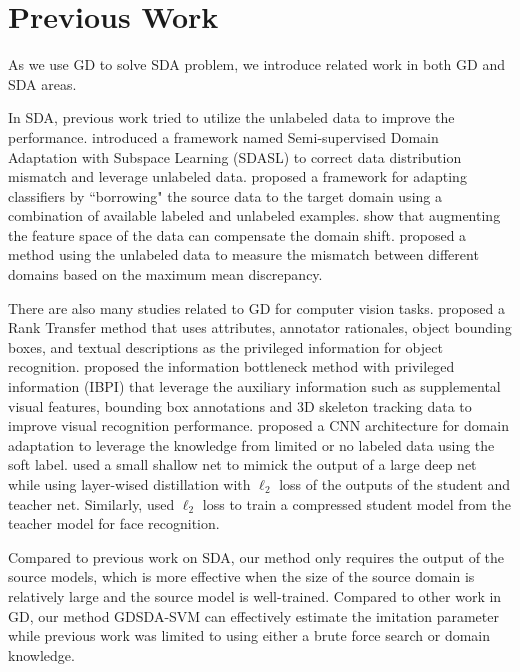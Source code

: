 \section{Previous Work}\label{sec:aaai:work}
As we use GD to solve SDA problem, we introduce related work in both GD and SDA areas.

In SDA, previous work tried to utilize the unlabeled data to improve the performance.  \cite{yao2015semi} introduced a framework named Semi-supervised Domain Adaptation with Subspace Learning (SDASL) to correct data distribution mismatch and leverage unlabeled data. \cite{Donahue_2013_CVPR} proposed a framework for adapting classifiers by ``borrowing" the source data to the target domain using a combination of available labeled and unlabeled examples. \cite{daume2010frustratingly} show that augmenting the feature space of the data can compensate the domain shift.
\cite{duan2009domain} proposed a method using the unlabeled data to measure the mismatch between different domains based on the maximum mean discrepancy. %

There are also many studies related to GD for computer vision tasks. \cite{Sharmanska_2013_ICCV} proposed a Rank Transfer method that uses attributes, annotator
rationales, object bounding boxes, and textual descriptions as the privileged information for object recognition. \cite{Motiian_2016_CVPR} proposed {the information bottleneck method with privileged information (IBPI)} that leverage the auxiliary information such as supplemental visual features, bounding box annotations and 3D skeleton tracking data to improve visual recognition performance. \cite{Tzeng_2015_ICCV} proposed a CNN architecture for domain adaptation to leverage the knowledge from limited or no labeled data using the soft label. \cite{urban2016deep} used a small shallow net to mimick the output of a large deep net while using layer-wised distillation with $\ell_2$ loss of the outputs of the student and teacher net. Similarly, \cite{luo2016face} used $\ell_2$ loss to train a compressed student model from the teacher model for face recognition. 

Compared to previous work on SDA, our method only requires the output of the source models, which is more effective when the size of the source domain is relatively large and the source model is well-trained. Compared to other work in GD, our method GDSDA-SVM can effectively estimate the imitation parameter while previous work was limited to using either a brute force search or domain knowledge.

